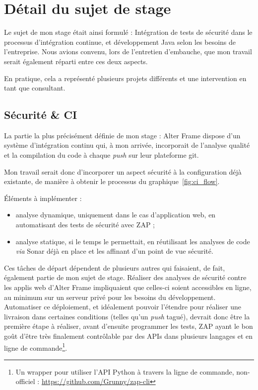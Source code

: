 \section{Détail du sujet de stage}
\label{sec:sujet}
Le sujet de mon stage était ainsi formulé : \og Intégration de tests de sécurité dans le processus d'intégration continue, et développement Java selon les besoins de l'entreprise. \fg Nous avions convenu, lors de l'entretien d'embauche, que mon travail serait également réparti entre ces deux aspects.

En pratique, cela a représenté plusieurs projets différents et une intervention en tant que consultant.

\subsection{Sécurité \& CI}
La partie la plus précisément définie de mon stage : Alter Frame dispose d'un système d'intégration continu qui, à mon arrivée, incorporait de l'analyse qualité et la compilation du code à chaque \textit{push} sur leur plateforme git.

Mon travail serait donc d'incorporer un aspect sécurité à la configuration déjà existante, de manière à obtenir le processus du graphique~\ref{fig:ci_flow}.

Éléments à implémenter :
\begin{itemize}[label=$\bullet$]
	\item analyse dynamique, uniquement dans le cas d'application web, en automatisant des tests de sécurité avec ZAP ;
	\item analyse statique, si le temps le permettait, en réutilisant les analyses de code \textit{via} Sonar déjà en place et les affinant d'un point de vue sécurité.
\end{itemize}
Ces tâches de départ dépendent de plusieurs autres qui faisaient, de fait, également partie de mon sujet de stage. Réaliser des analyses de sécurité contre les applis web d'Alter Frame impliquaient que celles-ci soient accessibles en ligne, au minimum sur un serveur privé pour les besoins du développement. Automatiser ce déploiement, et idéalement pouvoir l'étendre pour réaliser une livraison dans certaines conditions (telles qu'un \textit{push} tagué), devrait donc être la première étape à réaliser, avant d'ensuite programmer les tests, ZAP ayant le bon goût d'être très finalement contrôlable par des APIs dans plusieurs langages\cite{zap_api} et en ligne de commande\cite{zap_cli}\footnote{Un wrapper pour utiliser l'API Python à travers la ligne de commande, non-officiel : \url{https://github.com/Grunny/zap-cli}}.

